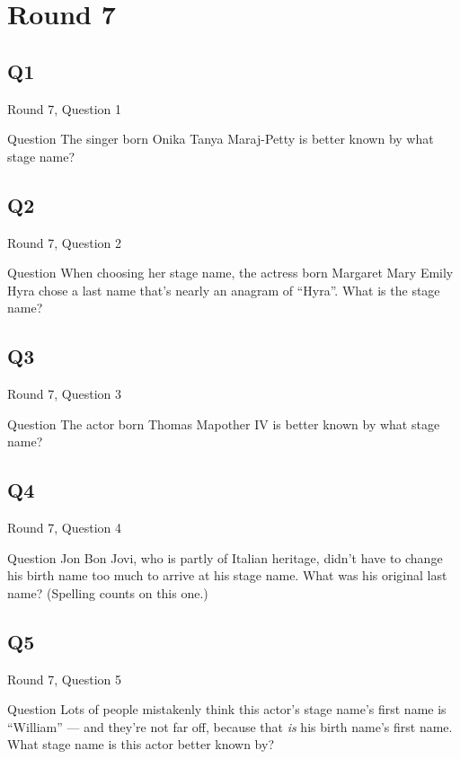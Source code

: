 \documentclass[11pt]{beamer}
\begin{document}
\section{Round 7}
\subsection*{Q1}
\begin{frame}[t]{Round 7, Question 1}
\begin{block}{Question}
The singer born Onika Tanya Maraj-Petty is better known by what stage name?
\end{block}
\end{frame}
\subsection*{Q2}
\begin{frame}[t]{Round 7, Question 2}
\begin{block}{Question}
When choosing her stage name, the actress born Margaret Mary Emily Hyra chose a last name that's nearly an anagram of ``Hyra''. What is the stage name?
\end{block}
\end{frame}
\subsection*{Q3}
\begin{frame}[t]{Round 7, Question 3}
\begin{block}{Question}
The actor born Thomas Mapother IV is better known by what stage name?
\end{block}
\end{frame}
\subsection*{Q4}
\begin{frame}[t]{Round 7, Question 4}
\begin{block}{Question}
Jon Bon Jovi, who is partly of  Italian heritage, didn't have to change his birth name too much to arrive at his stage name. What was his original last name? (Spelling counts on this one.)
\end{block}
\end{frame}
\subsection*{Q5}
\begin{frame}[t]{Round 7, Question 5}
\begin{block}{Question}
Lots of people mistakenly think this actor's stage name's first name is ``William'' --- and they're not far off, because that \emph{is} his birth name's first name. What stage name is this actor better known by?
\end{block}
\end{frame}
\end{document}
